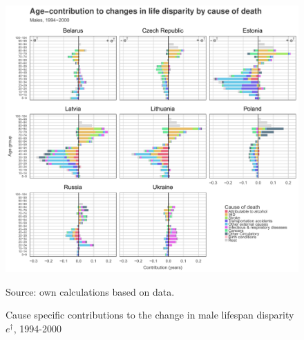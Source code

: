 \documentclass{article}
\begin{document}
\begin{figure}[h!]
\caption{Cause specific contributions to the change in  male lifespan disparity  $e^\dagger$, 1994-2000}
\label{Males_causes_1994}
\centering
\begin{center}
\includegraphics[scale=.53]{Figures/Cause_ed_decomp_Males_1.pdf}
\end{center}
Source: own calculations based on \citet{HcO} data. 
\end{figure}

\newpage
\end{document}
